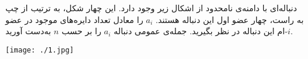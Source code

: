 \begin{PROBLEM}
    \p
دنباله‌ای با دامنه‌ی نامحدود از اشکال زیر وجود دارد. این چهار شکل، به ترتیب از چپ به راست، چهار عضو اول این دنباله هستند.‌
	 $a_i$
	را معادل تعداد دایره‌های موجود در عضو 
$i$-ام این دنباله در نظر بگیرید.
	جمله‌ی عمومی دنباله $a_i$ را بر حسب
	$n$
	به‌دست آورید.
	\p
	\begin{center}
		\texttt{[image: ./1.jpg]}
	\end{center}
\end{PROBLEM}